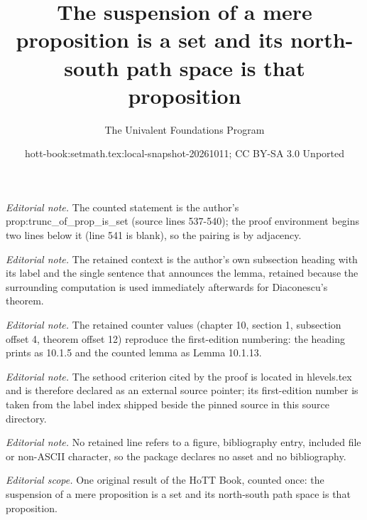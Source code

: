 \documentclass[10pt,a4paper]{article}
\title{The suspension of a mere proposition is a set and its north-south path space is that proposition}
\author{The Univalent Foundations Program}
\date{hott-book:setmath.tex:local-snapshot-20261011; CC BY-SA 3.0 Unported}
\newcounter{chapter}
\theoremstyle{definition}
\theoremstyle{remark}
\numberwithin{equation}{section}
\begin{document}
\maketitle
\setcounter{chapter}{10}
\setcounter{section}{1}
\setcounter{subsection}{4}
\setcounter{thm}{12}
\noindent\textit{Editorial note.} The counted statement is the author's prop:trunc\_of\_prop\_is\_set (source lines 537-540); the proof environment begins two lines below it (line 541 is blank), so the pairing is by adjacency.\par\medskip
\noindent\textit{Editorial note.} The retained context is the author's own subsection heading with its label and the single sentence that announces the lemma, retained because the surrounding computation is used immediately afterwards for Diaconescu's theorem.\par\medskip
\noindent\textit{Editorial note.} The retained counter values (chapter 10, section 1, subsection offset 4, theorem offset 12) reproduce the first-edition numbering: the heading prints as 10.1.5 and the counted lemma as Lemma 10.1.13.\par\medskip
\noindent\textit{Editorial note.} The sethood criterion cited by the proof is located in hlevels.tex and is therefore declared as an external source pointer; its first-edition number is taken from the label index shipped beside the pinned source in this source directory.\par\medskip
\noindent\textit{Editorial note.} No retained line refers to a figure, bibliography entry, included file or non-ASCII character, so the package declares no asset and no bibliography.\par\medskip
\noindent\textit{Editorial scope.} One original result of the HoTT Book, counted once: the suspension of a mere proposition is a set and its north-south path space is that proposition.\par\medskip
\end{document}

